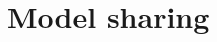\documentclass[\rootfolder/main.tex]{subfiles}
\begin{document}
\section{Model sharing}
\end{document}
